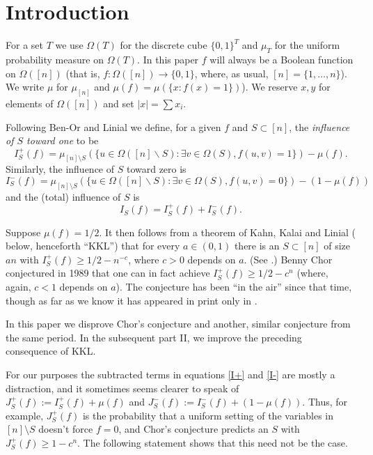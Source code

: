 \documentclass{toc}
\newcommand{\beq}[1]{\begin{equation}\label{#1}}
\newcommand{\enq}[0]{\end{equation}}
\newcommand{\mn}[0]{\medskip\noindent}
\newcommand{\sm}[0]{\setminus}
\renewcommand{\dots}[0]{,\ldots,}
\newcommand{\0}[0]{\emptyset}
\newcommand{\gO}[0]{\Omega}
\begin{document}
%
%
%


\section {Introduction}\label{Intro}

\mn


For a set $T$ we use $\Omega(T)$ for the discrete cube
$\{0,1\}^T$ and $\mu_T$ for the uniform probability measure
on $\Omega (T)$.
In this paper
$f$ will always be a Boolean function on $\gO([n])$
(that is, $f:\gO([n]) \to \{0,1\}$, where, as usual,
$[n]=\{1\dots n\}$).
We write $\mu$ for $\mu_{[n]}$ and
$\mu(f)= \mu (\{ x:f(x)= 1 \})$).
We reserve $x,y$ for elements of $\Omega([n])$
and set $|x| = \sum x_i$.





Following Ben-Or and Linial \cite {bl} we define,
for a given $f$ and
$S \subset [n]$, the \emph{influence of $S$ toward one}
to be
\beq{I+}
I^+_S(f) = \mu_{[n]\sm S}( \{u \in \Omega ([n]\backslash S):
\exists v \in \Omega(S), f(u,v)=1\})- \mu(f) .
\enq
Similarly, the influence of $S$ toward zero is
\beq{I-}
I^-_S(f) = \mu_{[n]\sm S}( \{u \in \Omega ([n]\backslash S):
\exists v \in \Omega(S), f(u,v)=0\})- (1-\mu(f) )
\enq
and the (total) influence of $S$ is
$$I_S(f)=I_S^+(f)+I_S^-(f).$$


Suppose $\mu(f) =1/2$.
It then follows from a theorem of Kahn, Kalai and Linial
\cite{kkl}
( below, henceforth ``KKL'')
that for every $a\in (0,1) $ there is an $S \subset [n]$ of size
$an$ with
$I^+_S(f)\ge 1/2-n^{-c}$, where $c>0$ depends on $a$.
(See .)
Benny Chor conjectured in 1989 \cite {benny} that one can in fact
achieve
$I^+_S(f)\ge 1/2-c^n$ (where, again, $c<1$ depends on $a$).
The conjecture has been ``in the air'' since that time,
though as far as we know
it has appeared in print only in
\cite{k:nati,Nati}.

%
In this paper we disprove
Chor's conjecture and another, similar conjecture
from the same period. In the subsequent part II,
we improve the preceding consequence of KKL.

For our purposes the subtracted terms in
equations %
%
\eqref{I+} and
\eqref{I-} are mostly a distraction, and it sometimes seems
clearer to speak of $J^+_S(f):=I^+_S(f)+\mu(f) $
and $J^-_S(f):=I^-_S(f)+(1-\mu(f) )$.
Thus, for example, $J^+_S(f)$ is the probability that
a uniform setting of the variables in $[n]\sm S$
doesn't force $f=0$, and Chor's conjecture predicts
an $S$ with $J^+_S(f)\ge 1-c^n$.
The following statement shows that this need not be the case.
\end{document}
